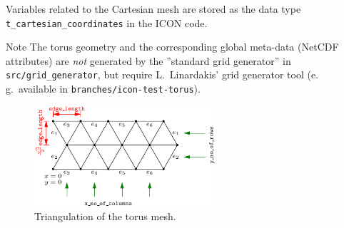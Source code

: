 \documentclass{article}
\begin{document}
Variables related to the Cartesian mesh are stored as the data type
\texttt{t\_cartesian\_coordinates} in the ICON code.

\begin{paragraph}{Note}
  The torus geometry and the corresponding global meta-data (NetCDF attributes)
  are \emph{not} generated by the ''standard grid generator''
  in \texttt{src/grid\_generator}, but require L.\ Linardakis' grid generator
  tool (e.\,g.\ available in \texttt{branches/icon-test-torus}).
\end{paragraph}

\begin{figure}[ht]
  \centering
  \includegraphics[width=0.6\textwidth]{torus_plane.pdf}
  \caption{Triangulation of the torus mesh.}
  \label{fig2}
\end{figure}
\end{document}
